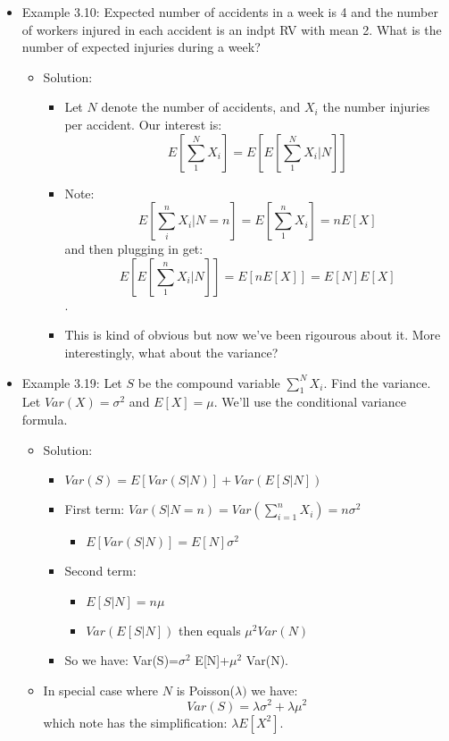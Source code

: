 \documentclass[10pt,containsverbatim,paralist]{article}
\begin{document}
\begin{itemize}
\begin{itemize}
\label{sec-1-1-7-3-1}
\begin{itemize}
\item Example 3.10: Expected number of accidents in a week is 4 and the number of  workers injured in each accident is an indpt RV with mean 2. What is the  number of expected injuries during a week?
\label{sec-1-1-7-3-1-1}
\begin{itemize}
\item Solution:
\begin{itemize}
\item Let $N$ denote the number of accidents, and $X_i$ the number injuries per
accident.  Our interest is: $$E[\sum_1^N X_i]=E[E[\sum_1^N X_i|N]]$$
\item Note: $$E[\sum_i^n X_i|N=n]=E[\sum_1^n X_i] = nE[X]$$ and then plugging in
get: $$E[E[\sum_1^n X_i|N]]=E[nE[X]]=E[N]E[X]$$.
\item This is kind of obvious but now we've been rigourous about it.  More
interestingly, what about the variance?
\end{itemize}
\end{itemize}
\item Example 3.19: Let $S$ be the compound variable $\sum_1^N X_i$.  Find the variance.  Let $Var(X)=\sigma^2$ and $E[X]=\mu$.  We'll use the conditional variance formula.
\label{sec-1-1-7-3-1-2}
\begin{itemize}
\item Solution:
\begin{itemize}
\item $Var(S)=E[Var(S|N)]+Var(E[S|N])$
\item First term: $Var(S|N=n)=Var(\sum_{i=1}^n X_i)=n\sigma^2$
\begin{itemize}
\item $E[Var(S|N)]=E[N]\sigma^2$
\end{itemize}
\item Second term:
\begin{itemize}
\item $E[S|N]=n\mu$
\item $Var(E[S|N])$ then equals $\mu^2 Var(N)$
\end{itemize}
\item So we have: Var(S)=$\sigma$$^{\text{2}}$ E[N]+$\mu$$^{\text{2}}$ Var(N).
\end{itemize}
\item In special case where $N$ is Poisson($\lambda)$ we
have:$$Var(S)=\lambda\sigma^2+\lambda \mu^2$$ which note has the
simplification: $\lambda E[X^2]$.
\end{itemize}
\end{itemize}
\end{itemize}
\end{itemize}
\end{document}
